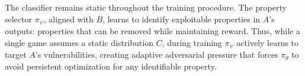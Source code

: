 The classifier remains static throughout the training procedure. The property selector $\pi_\psi$, aligned with $B$, learns to identify exploitable properties in $A$'s outputs: properties that can be removed while maintaining reward. Thus, while a single game assumes a static distribution $C$, during training $\pi_\psi$ actively learns to target $A$'s vulnerabilities, creating adaptive adversarial pressure that forces $\pi_\theta$ to avoid persistent optimization for any identifiable property.

% 
% 

